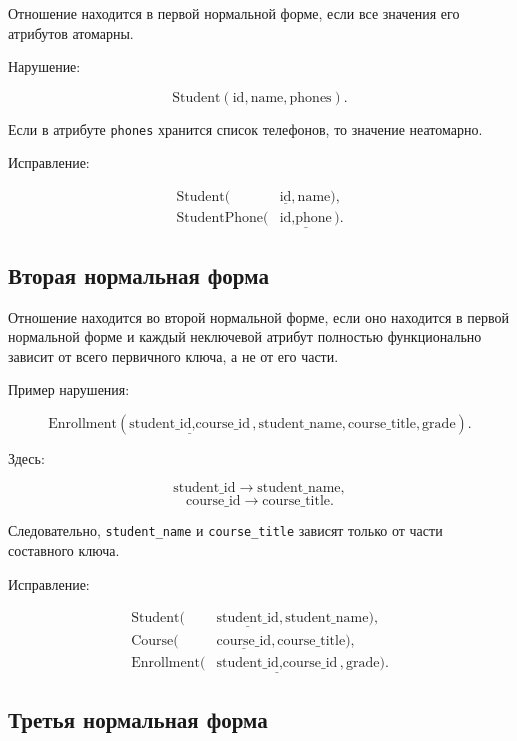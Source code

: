 \documentclass[12pt,a4paper]{article}
\theoremstyle{remark}
\begin{document}
Отношение находится в первой нормальной форме, если все значения его атрибутов атомарны.

Нарушение:

\[
    \text{Student}(\text{id}, \text{name}, \text{phones}).
\]

Если в атрибуте \texttt{phones} хранится список телефонов, то значение неатомарно.

Исправление:

\[
\begin{aligned}
    \text{Student}(&\underline{\text{id}}, \text{name}),\\
    \text{StudentPhone}(&\underline{\text{id}, \text{phone}}).
\end{aligned}
\]

\subsection{Вторая нормальная форма}

Отношение находится во второй нормальной форме, если оно находится в первой нормальной форме и каждый неключевой атрибут полностью функционально зависит от всего первичного ключа, а не от его части.

Пример нарушения:

\[
    \text{Enrollment}(\underline{\text{student\_id}, \text{course\_id}}, \text{student\_name}, \text{course\_title}, \text{grade}).
\]

Здесь:

\[
    \text{student\_id} \rightarrow \text{student\_name},
\]
\[
    \text{course\_id} \rightarrow \text{course\_title}.
\]

Следовательно, \texttt{student\_name} и \texttt{course\_title} зависят только от части составного ключа.

Исправление:

\[
\begin{aligned}
    \text{Student}(&\underline{\text{student\_id}}, \text{student\_name}),\\
    \text{Course}(&\underline{\text{course\_id}}, \text{course\_title}),\\
    \text{Enrollment}(&\underline{\text{student\_id}, \text{course\_id}}, \text{grade}).
\end{aligned}
\]

\subsection{Третья нормальная форма}
\end{document}
